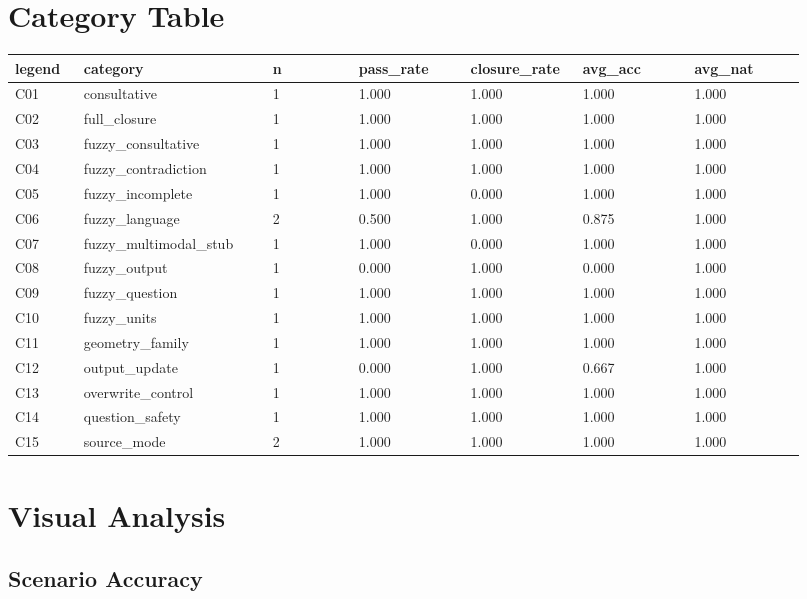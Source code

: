 \documentclass[11pt]{ctexart}
\begin{document}
\section{Category Table}
\begin{longtable}{p{0.08\linewidth}p{0.22\linewidth}p{0.10\linewidth}p{0.13\linewidth}p{0.13\linewidth}p{0.13\linewidth}p{0.13\linewidth}}
\toprule
legend & category & n & pass\_rate & closure\_rate & avg\_acc & avg\_nat \\
\midrule
C01 & consultative & 1 & 1.000 & 1.000 & 1.000 & 1.000 \\
C02 & full\_closure & 1 & 1.000 & 1.000 & 1.000 & 1.000 \\
C03 & fuzzy\_consultative & 1 & 1.000 & 1.000 & 1.000 & 1.000 \\
C04 & fuzzy\_contradiction & 1 & 1.000 & 1.000 & 1.000 & 1.000 \\
C05 & fuzzy\_incomplete & 1 & 1.000 & 0.000 & 1.000 & 1.000 \\
C06 & fuzzy\_language & 2 & 0.500 & 1.000 & 0.875 & 1.000 \\
C07 & fuzzy\_multimodal\_stub & 1 & 1.000 & 0.000 & 1.000 & 1.000 \\
C08 & fuzzy\_output & 1 & 0.000 & 1.000 & 0.000 & 1.000 \\
C09 & fuzzy\_question & 1 & 1.000 & 1.000 & 1.000 & 1.000 \\
C10 & fuzzy\_units & 1 & 1.000 & 1.000 & 1.000 & 1.000 \\
C11 & geometry\_family & 1 & 1.000 & 1.000 & 1.000 & 1.000 \\
C12 & output\_update & 1 & 0.000 & 1.000 & 0.667 & 1.000 \\
C13 & overwrite\_control & 1 & 1.000 & 1.000 & 1.000 & 1.000 \\
C14 & question\_safety & 1 & 1.000 & 1.000 & 1.000 & 1.000 \\
C15 & source\_mode & 2 & 1.000 & 1.000 & 1.000 & 1.000 \\
\bottomrule
\end{longtable}
\section{Visual Analysis}
\subsection{Scenario Accuracy}
\begin{center}\end{center}
\end{document}
